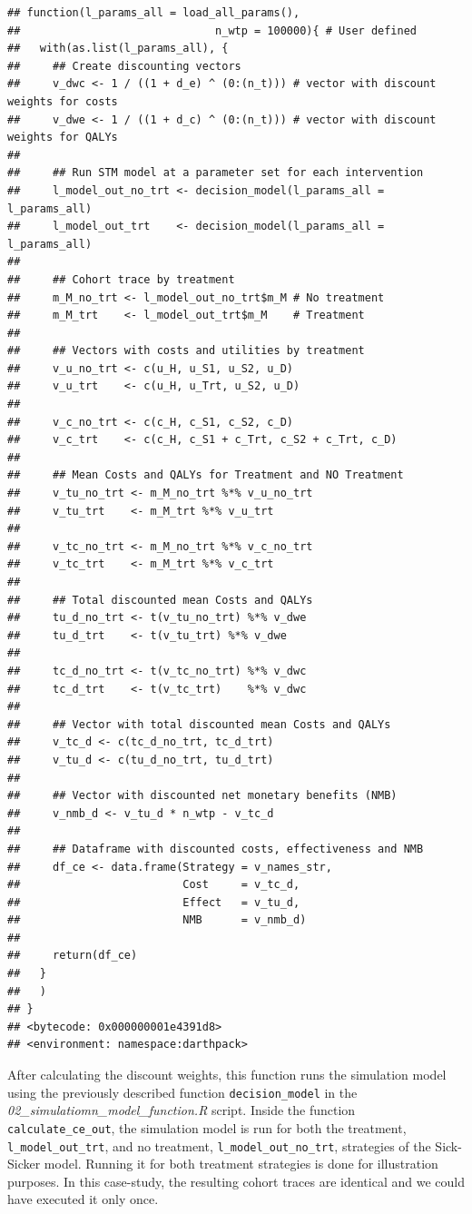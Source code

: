 \documentclass[]{book}
\begin{document}
\begin{verbatim}
## function(l_params_all = load_all_params(), 
##                              n_wtp = 100000){ # User defined
##   with(as.list(l_params_all), {
##     ## Create discounting vectors
##     v_dwc <- 1 / ((1 + d_e) ^ (0:(n_t))) # vector with discount weights for costs
##     v_dwe <- 1 / ((1 + d_c) ^ (0:(n_t))) # vector with discount weights for QALYs
##     
##     ## Run STM model at a parameter set for each intervention
##     l_model_out_no_trt <- decision_model(l_params_all = l_params_all)
##     l_model_out_trt    <- decision_model(l_params_all = l_params_all)
##     
##     ## Cohort trace by treatment
##     m_M_no_trt <- l_model_out_no_trt$m_M # No treatment
##     m_M_trt    <- l_model_out_trt$m_M    # Treatment
##     
##     ## Vectors with costs and utilities by treatment
##     v_u_no_trt <- c(u_H, u_S1, u_S2, u_D)
##     v_u_trt    <- c(u_H, u_Trt, u_S2, u_D)
##     
##     v_c_no_trt <- c(c_H, c_S1, c_S2, c_D)
##     v_c_trt    <- c(c_H, c_S1 + c_Trt, c_S2 + c_Trt, c_D)
##     
##     ## Mean Costs and QALYs for Treatment and NO Treatment
##     v_tu_no_trt <- m_M_no_trt %*% v_u_no_trt
##     v_tu_trt    <- m_M_trt %*% v_u_trt
##     
##     v_tc_no_trt <- m_M_no_trt %*% v_c_no_trt
##     v_tc_trt    <- m_M_trt %*% v_c_trt
##     
##     ## Total discounted mean Costs and QALYs
##     tu_d_no_trt <- t(v_tu_no_trt) %*% v_dwe 
##     tu_d_trt    <- t(v_tu_trt) %*% v_dwe
##     
##     tc_d_no_trt <- t(v_tc_no_trt) %*% v_dwc
##     tc_d_trt    <- t(v_tc_trt)    %*% v_dwc
##     
##     ## Vector with total discounted mean Costs and QALYs
##     v_tc_d <- c(tc_d_no_trt, tc_d_trt)
##     v_tu_d <- c(tu_d_no_trt, tu_d_trt)
##     
##     ## Vector with discounted net monetary benefits (NMB)
##     v_nmb_d <- v_tu_d * n_wtp - v_tc_d
##     
##     ## Dataframe with discounted costs, effectiveness and NMB
##     df_ce <- data.frame(Strategy = v_names_str,
##                         Cost     = v_tc_d,
##                         Effect   = v_tu_d,
##                         NMB      = v_nmb_d)
##     
##     return(df_ce)
##   }
##   )
## }
## <bytecode: 0x000000001e4391d8>
## <environment: namespace:darthpack>
\end{verbatim}

After calculating the discount weights, this function runs the simulation model using the previously described function \texttt{decision\_model} in the \emph{02\_simulatiomn\_model\_function.R} script. Inside the function \texttt{calculate\_ce\_out}, the simulation model is run for both the treatment, \texttt{l\_model\_out\_trt}, and no treatment, \texttt{l\_model\_out\_no\_trt}, strategies of the Sick-Sicker model. Running it for both treatment strategies is done for illustration purposes. In this case-study, the resulting cohort traces are identical and we could have executed it only once.
\end{document}
